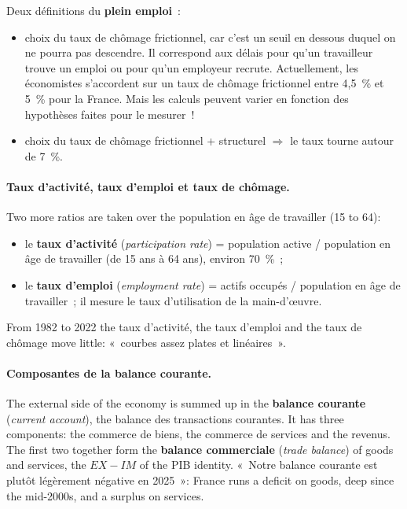 \begin{definition}
  Deux définitions du \textbf{plein emploi}~:
  \begin{itemize}
    \item choix du taux de chômage frictionnel, car c'est un seuil en dessous
      duquel on ne pourra pas descendre. Il correspond aux délais pour qu'un
      travailleur trouve un emploi ou pour qu'un employeur recrute.
      Actuellement, les économistes s'accordent sur un taux de chômage
      frictionnel entre 4,5~\% et 5~\% pour la France. Mais les calculs peuvent
      varier en fonction des hypothèses faites pour le mesurer~!
    \item choix du taux de chômage frictionnel + structurel $\Rightarrow$ le taux
      tourne autour de 7~\%.
  \end{itemize}
\end{definition}

\paragraph{Taux d'activité, taux d'emploi et taux de chômage.} Two more ratios
are taken over the population en âge de travailler (15 to 64):
\begin{itemize}
  \item le \textbf{taux d'activité} (\textit{participation rate}) = population
    active / population en âge de travailler (de 15 ans à 64 ans), environ
    70~\%~;
  \item le \textbf{taux d'emploi} (\textit{employment rate}) = actifs occupés /
    population en âge de travailler~; il mesure le taux d'utilisation de la
    main-d'œuvre.
\end{itemize}
From 1982 to 2022 the taux d'activité, the taux d'emploi and the taux de chômage
move little: «~courbes assez plates et linéaires~».

\paragraph{Composantes de la balance courante.} The external side of the
economy is summed up in the \textbf{balance courante} (\textit{current
account}), the balance des transactions courantes. It has three components:
the commerce de biens, the commerce de services and the revenus. The first two
together form the \textbf{balance commerciale} (\textit{trade balance}) of
goods and services, the $EX - IM$ of the PIB identity. «~Notre balance courante
est plutôt légèrement négative en 2025~»: France runs a deficit on goods, deep
since the mid-2000s, and a surplus on services.\\

